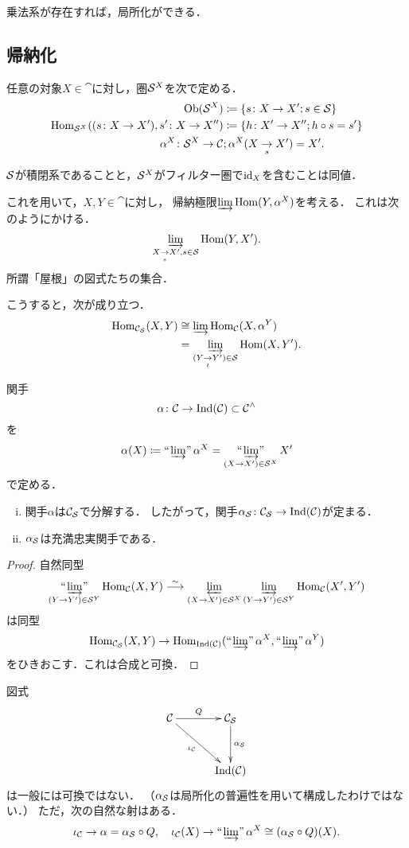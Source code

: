 乗法系が存在すれば，局所化ができる．

\subsection{帰納化}
任意の対象\(X\in\cat\)に対し，圏\(\calS^X\)を次で定める．
\begin{align*}
    \Ob(\calS^X)
    &\coloneqq
    \left\{s\colon{X}\to{X'};s\in\calS\right\}\\
    \Hom_{\calS^X}((s\colon{X}\to{X'}),s'\colon{X}\to{X''})
    &\coloneqq
    \left\{h\colon{X'}\to{X''};h\circ{s}=s'\right\}\\
    \alpha^X\colon\calS^X\to\cat&;\alpha^X(X\underset{s}{\to}X')=X'.
\end{align*}
\begin{Fact}
    \(\calS\)が積閉系であることと，\(\calS^X\)がフィルター圏で\(\id_X\)を含むことは同値．
\end{Fact}
これを用いて，\(X,Y\in\cat\)に対し，
帰納極限\(\varinjlim\Hom(Y,\alpha^X)\)を考える．
これは次のようにかける．
\[
    \varinjlim_{X\underset{s}{\to}X',s\in\calS}\Hom(Y,X').
\]
所謂「屋根」の図式たちの集合．

こうすると，次が成り立つ．
\begin{align*}
    \Hom_{\cat_\calS}(X,Y)
    &\cong\varinjlim\Hom_\cat(X,\alpha^Y)\\
    &=\varinjlim_{(Y\underset{t}{\to}Y')\in\calS}\Hom(X,Y').
\end{align*}

関手
\[
    \alpha\colon\cat\to\Ind(\cat)\subset\cat^\wedge
\]
を
\[
    \alpha(X)\coloneqq\limf\alpha^X
    =\limf_{(X\to X')\in\calS^X}X'
\]
で定める．
\begin{Proposition}
    \begin{enumerate}[(i)]
        \item 関手\(\alpha\)は\(\cat_\calS\)で分解する．
        したがって，関手\(\alpha_\calS\colon\cat_\calS\to\Ind(\cat)\)が定まる．
        \item \(\alpha_\calS\)は充満忠実関手である．
    \end{enumerate}
\end{Proposition}
\begin{proof}
    自然同型
    \[
        \limf_{(Y\to{Y'})\in\calS^Y}\Hom_\cat(X,Y)
        \overset{\sim}{\longrightarrow}\varprojlim_{(X\to{X'})\in\calS^X}\varinjlim_{(Y\to{Y'})\in\calS^Y}\Hom_\cat(X',Y')
    \]は同型
    \[
        \Hom_{\cat_\calS}(X,Y)
        \to
        \Hom_{\Ind(\cat)}(\limf\alpha^X,\limf\alpha^Y)
    \]をひきおこす．これは合成と可換．
\end{proof}
図式
\[\vcenter{\xymatrix@C=32pt@R=32pt{
    \cat
    \ar[r]^-{Q}
    \ar[rd]_-{\iota_\cat}
    &
    \cat_\calS
    \ar[d]^-{\alpha_\calS}
    \\
    &\Ind(\cat)
}}\]
は一般には可換ではない．
（\(\alpha_\calS\)は局所化の普遍性を用いて構成したわけではない．）
ただ，次の自然な射はある．
\begin{equation}
    \iota_\cat\to\alpha=\alpha_\calS\circ{Q},
    \quad 
    \iota_\cat(X)\to\limf\alpha^X\cong (\alpha_\calS\circ Q)(X).
\end{equation}
